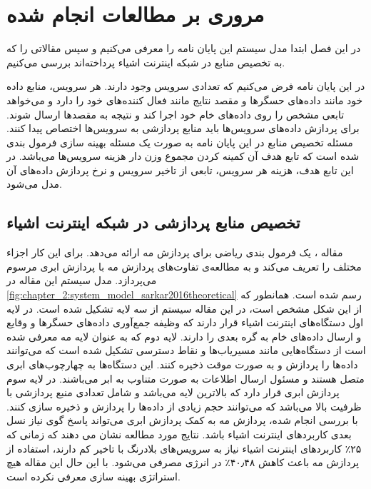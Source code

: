\chapter{مروری بر مطالعات انجام شده}\label{chap:literature_review}
  \thispagestyle{empty}
  در این فصل ابتدا مدل سیستم این پایان نامه را معرفی می‌کنیم و سپس مقالاتی را که به تخصیص منابع در شبکه اینترنت اشیاء پرداخته‌اند بررسی می‌کنیم.

  در این پایان نامه فرض می‌کنیم که تعدادی سرویس وجود دارند.
  هر سرویس، منابع داده خود مانند داده‌های حسگر‌ها و مقصد نتایج مانند فعال کننده‌های خود را دارد و می‌خواهد تابعی مشخص را روی  داده‌های خام خود اجرا کند و نتیجه به مقصد‌ها ارسال شوند.
  برای پردازش داده‌های سرویس‌ها باید منابع پردازشی به سرویس‌ها اختصاص پیدا کنند.
  مسئله تخصیص منابع در این پایان نامه به صورت یک مسئله بهینه سازی فرمول بندی شده است که تابع هدف آن کمینه کردن مجموع وزن دار هزینه سرویس‌ها می‌باشد.
  در این تابع هدف، هزینه هر سرویس، تابعی از تاخیر سرویس و نرخ پردازش داده‌های آن مدل می‌شود.

  \section{تخصیص منابع پردازشی در شبکه اینترنت اشیاء}
    مقاله \cite{sarkar2016theoretical}، یک فرمول بندی ریاضی برای پردازش مه ارائه می‌دهد.
    برای این کار اجزاء مختلف را تعریف می‌کند و به مطالعه‌ی تفاوت‌های پردازش مه با پردازش ابری مرسوم می‌پردازد.
    مدل سیستم این مقاله در \cref{fig:chapter_2:system_model_sarkar2016theoretical} رسم شده است.
    همانطور که از این شکل مشخص است، در این مقاله سیستم از سه لایه تشکیل شده است.
    در لایه اول دستگاه‌های اینترنت اشیاء قرار دارند که وظیفه جمع‌آوری داده‌های حسگر‌ها و وقایع و ارسال داده‌های خام به گره بعدی را دارند.
    لایه دوم که به عنوان لایه مه معرفی شده است از دستگاه‌هایی مانند مسیریاب‌ها و نقاط دسترسی تشکیل شده است که می‌توانند داده‌ها را پردازش و به صورت موقت ذخیره کنند.
    این دستگاه‌ها به چهارچوب‌های ابری متصل هستند و مسئول ارسال اطلاعات به صورت متناوب به ابر می‌باشند.
    در لایه سوم پردازش ابری قرار دارد که بالاترین لایه می‌باشد و شامل تعدادی منبع پردازشی با ظرفیت بالا می‌باشد که می‌توانند حجم زیادی از داده‌‌ها را پردازش و ذخیره سازی کنند.
    با بررسی انجام شده، پردازش مه به کمک پردازش ابری می‌تواند پاسخ گوی نیاز نسل بعدی کاربرد‌های اینترنت اشیاء باشد.
    نتایج مورد مطالعه نشان می دهند که زمانی که ۲۵٪ کاربرد‌های اینترنت اشیاء نیاز به سرویس‌های بلادرنگ با تاخیر کم دارند، استفاده از پردازش مه باعث کاهش ۴۰٫۴۸٪ در انرژی مصرفی می‌شود.
    با این حال این مقاله هیچ استراتژی بهینه سازی معرفی نکرده است.

